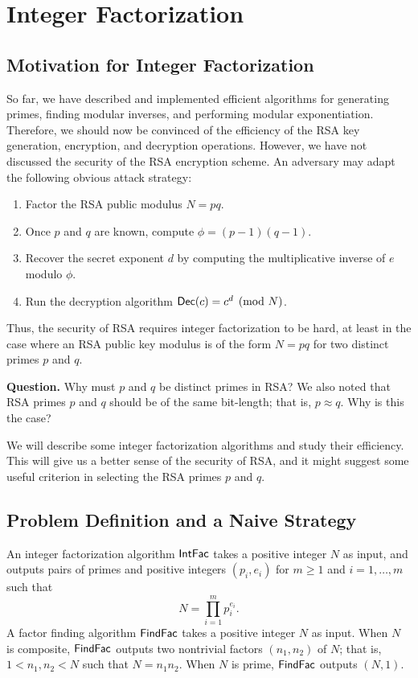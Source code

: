 \section{Integer Factorization}

\subsection{Motivation for Integer Factorization}
So far, we have described and implemented efficient algorithms for generating
primes, finding modular inverses, and performing modular exponentiation. 
Therefore, we should now be convinced of the efficiency of the RSA key generation,
encryption, and decryption operations. However, we have not discussed the 
security of the RSA encryption scheme. An adversary may adapt the following 
obvious attack strategy:
\begin{enumerate}
    \item Factor the RSA public modulus $N = pq$. 
    \item Once $p$ and $q$ are known, compute $\phi = (p-1)(q-1)$. 
    \item Recover the secret exponent $d$ by computing the multiplicative inverse
    of $e$ modulo $\phi$. 
    \item Run the decryption algorithm ${\sf Dec}(c) = c^d \pmod N$. 
\end{enumerate}
Thus, the security of RSA requires integer factorization to be hard, at least 
in the case where an RSA public key modulus is of the form $N = pq$ for 
two distinct primes $p$ and $q$. 

{\bf Question.} Why must $p$ and $q$ be distinct primes in RSA? We also noted 
that RSA primes $p$ and $q$ should be of the same bit-length; that is, 
$p \approx q$. Why is this the case?

We will describe some integer factorization algorithms and study their efficiency.
This will give us a better sense of the security of RSA, and it might suggest 
some useful criterion in selecting the RSA primes $p$ and $q$. 

\subsection{Problem Definition and a Naive Strategy}
An integer factorization algorithm ${\sf IntFac}$ takes a positive integer $N$ as input,
and outputs pairs of primes and positive integers $(p_i, e_i)$ for $m \geq 1$ 
and $i = 1, \dots, m$ such that 
\[ N = \prod_{i=1}^m p_i^{e_i}. \]
A factor finding algorithm ${\sf FindFac}$ takes a positive integer $N$ as input. 
When $N$ is composite, ${\sf FindFac}$ outputs two nontrivial factors $(n_1, n_2)$ of 
$N$; that is, $1 < n_1, n_2 < N$ such that $N = n_1n_2$. When $N$ is prime, 
${\sf FindFac}$ outputs $(N, 1)$. 

